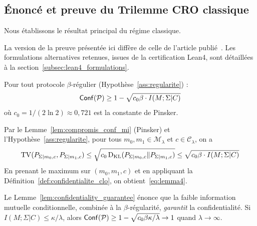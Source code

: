\subsection{\'Enonc\'e et preuve du Trilemme CRO classique}
\label{subsec:enonce_trilemme}
\begin{sloppypar}
Nous \'etablissons le r\'esultat principal du r\'egime classique.

\begin{remark}
\label{rem:version_preuve_classique}
La version de la preuve pr\'esent\'ee ici diff\`ere de celle de l'article
publi\'e~\cite{MINKA2026CRO}. Les formulations alternatives retenues, issues
de la certification Lean4, sont d\'etaill\'ees \`a la
section~\ref{subsec:lean4_formulations}.
\end{remark}

\begin{lemma}
\label{lem:confidentiality_guarantee}
Pour tout protocole $\beta$-r\'egulier (Hypoth\`ese~\ref{ass:regularite}) :
\begin{equation}
\mathsf{Conf}(\mathcal{P}) \geq 1 - \sqrt{c_0 \beta \cdot I(M;\Sigma|C)}
\label{eq:lemma4}
\end{equation}
o\`u $c_0 = 1/(2\ln 2) \approx 0{,}721$ est la constante de Pinsker.
\end{lemma}

\begin{Preuve}
Par le Lemme~\ref{lem:compromis_conf_mi} (Pinsker) et
l'Hypoth\`ese~\ref{ass:regularite}, pour tous $m_0, m_1 \in
\mathcal{M}_\lambda$ et $c \in \mathcal{C}_\lambda$, on a
\begin{equation}
\operatorname{TV}(P_{\Sigma|m_0,c}, P_{\Sigma|m_1,c}) \leq \sqrt{c_0 \operatorname{D_{\text{KL}}}(P_{\Sigma|m_0,c} \| P_{\Sigma|m_1,c})} \leq \sqrt{c_0 \beta \cdot I(M;\Sigma|C)}
\end{equation}
En prenant le maximum sur $(m_0, m_1, c)$ et en appliquant la
D\'efinition~\ref{def:confidentialite_clo}, on obtient~\eqref{eq:lemma4}.
\end{Preuve}

\begin{remark}
\label{rem:interp_lemme4}
Le Lemme~\ref{lem:confidentiality_guarantee} \'enonce que la faible
information mutuelle conditionnelle, combin\'ee \`a la
$\beta$-r\'egularit\'e, \emph{garantit} la confidentialit\'e. Si
$I(M;\Sigma|C) \leq \kappa/\lambda$, alors
$\mathsf{Conf}(\mathcal{P}) \geq 1 - \sqrt{c_0 \beta \kappa/\lambda} \to 1$
quand $\lambda \to \infty$.
\end{remark}


\end{sloppypar}
